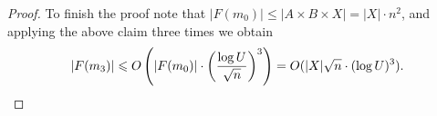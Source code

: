 \documentclass[10pt,a4paper]{article}
\begin{document}
\begin{proof}
To finish the proof note that $|F(m_0)| \leqslant |A \times B \times X| = |X| \cdot n^2$, and applying the above claim three times we obtain
\[|F(m_3)| \leqslant O\left(|F(m_0)| \cdot \left(\frac{\log U}{\sqrt n}\right)^3\right) = O(|X| \sqrt{n} \cdot (\log U)^3).\qedhere\]
\end{proof}




\end{document}

